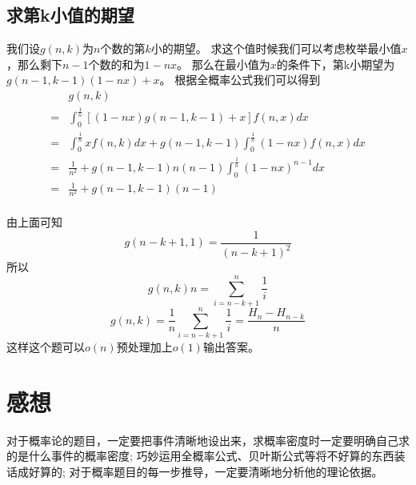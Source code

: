 \documentclass[11pt,a4paper]{article}
\begin{document}
\subsection{求第k小值的期望}
我们设$g(n,k)$为$n$个数的第$k$小的期望。
求这个值时候我们可以考虑枚举最小值$x$，那么剩下$n-1$个数的和为$1-nx$。
那么在最小值为$x$的条件下，第k小期望为$g(n-1,k-1)(1-nx)+x$。
根据全概率公式我们可以得到
$$
\begin{array}{rl}
	& g(n,k) \\
=	& \int_{0}^{\frac{1}{n}} \left[ (1-nx)g(n-1,k-1)+x \right] f(n,x) dx \\
=	& \int_{0}^{\frac{1}{n}} xf(n,k) dx + g(n-1,k-1) \int_{0}^{\frac{1}{n}}(1-nx)f(n,x) dx \\
=	& \frac{1}{n^2} + g(n-1,k-1)n(n-1) \int_{0}^{\frac{1}{n}} (1-nx)^{n-1} dx \\
=	& \frac{1}{n^2} + g(n-1,k-1)(n-1) \\
\end{array}
$$

由上面可知
\[
	g(n-k+1,1) = \frac{1}{(n-k+1)^2}
\]
所以
\[
	g(n,k)n = \sum_{i=n-k+1}^{n} \frac{1}{i} 
\]
\[
	g(n,k) = \frac{1}{n} \sum_{i=n-k+1}^{n} \frac{1}{i} = \frac{H_n-H_{n-k}}{n}
\]
这样这个题可以$o(n)$预处理加上$o(1)$输出答案。

\section{感想}
对于概率论的题目，一定要把事件清晰地设出来，求概率密度时一定要明确自己求的是什么事件的概率密度;
巧妙运用全概率公式、贝叶斯公式等将不好算的东西装话成好算的;
对于概率题目的每一步推导，一定要清晰地分析他的理论依据。
\end{document}
